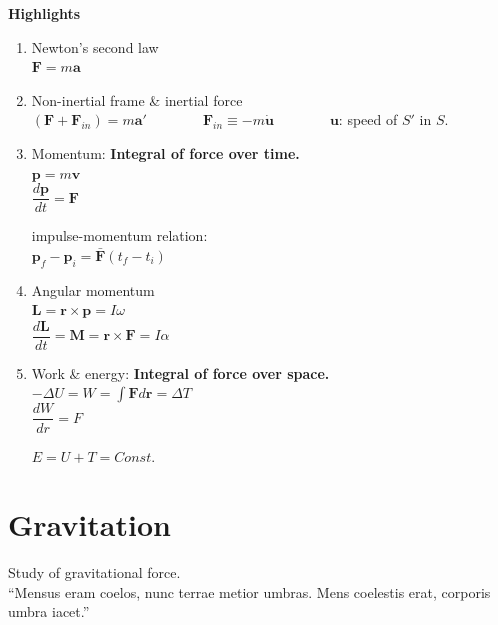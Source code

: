 \documentclass[11pt, a4paper, oneside]{book}
\numberwithin{equation}{section}%
\begin{document}
\textbf{Highlights}
\begin{enumerate}
	\item Newton's second law\\
	$\bm{F} = m\bm{a}$
	\item Non-inertial frame \& inertial force\\
	$ (\bm{F} + \bm{F}_{in} ) = m\bm{a}' $~~~~~~~~$ \bm{F}_{in} \equiv - m\dot{\bm{u}} $~~~~~~~~$\bm{u}$: speed of $S'$ in $S$.
	
	\item Momentum: \textbf{Integral of force over time.}\\
	$ \bm{p} = m\bm{v} $\\
	\large{$ \dfrac{d\bm{p}}{dt} = \bm{F} $}
	
	impulse-momentum relation: \\
	$ \bm{p}_f - \bm{p}_i = \bar{\bm{F}}\left(t_f - t_i\right) $
	
	\item Angular momentum\\
	$ \bm{L} = \bm{r} \times \bm{p} = I\omega$\\
	\large{$ \dfrac{d\bm{L}}{dt} = \bm{M} = \bm{r} \times \bm{F} = I \alpha$}
	
	\item Work \& energy: \textbf{Integral of force over space.}\\
	$ -\Delta U = W = \int \bm{F}d\bm{r} = \Delta T$\\
	\large{$ \dfrac{dW}{dr} = F $}
	
	$ E = U + T = Const. $

\end{enumerate}

\section{Gravitation}
Study of gravitational force.\\
``Mensus eram coelos, nunc terrae metior umbras. Mens coelestis erat, corporis umbra iacet.''\\
\end{document}
